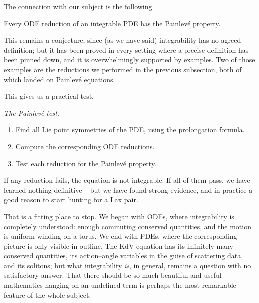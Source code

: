 The connection with our subject is the following.

\begin{conjecture}
	Every ODE reduction of an integrable PDE has the Painlev\'e property.
\end{conjecture}

This remains a conjecture, since (as we have said) integrability has no agreed definition; but it has been proved in every setting where a precise definition has been pinned down, and it is overwhelmingly supported by examples. Two of those examples are the reductions we performed in the previous subsection, both of which landed on Painlev\'e equations.

This gives us a practical test.

\begin{center}
	\emph{The Painlev\'e test.}
\end{center}
\begin{enumerate}[label=(\arabic*)]
	\item Find all Lie point symmetries of the PDE, using the prolongation formula.
	\item Compute the corresponding ODE reductions.
	\item Test each reduction for the Painlev\'e property.
\end{enumerate}
If any reduction fails, the equation is not integrable. If all of them pass, we have learned nothing definitive -- but we have found strong evidence, and in practice a good reason to start hunting for a Lax pair.

That is a fitting place to stop. We began with ODEs, where integrability is completely understood: enough commuting conserved quantities, and the motion is uniform winding on a torus. We end with PDEs, where the corresponding picture is only visible in outline. The KdV equation has its infinitely many conserved quantities, its action--angle variables in the guise of scattering data, and its solitons; but what integrability \emph{is}, in general, remains a question with no satisfactory answer. That there should be so much beautiful and useful mathematics hanging on an undefined term is perhaps the most remarkable feature of the whole subject.

